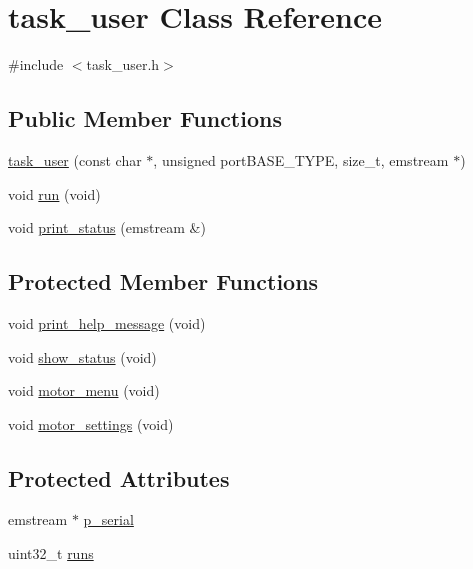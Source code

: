 \hypertarget{classtask__user}{\section{task\-\_\-user \-Class \-Reference}
\label{classtask__user}
}


{\ttfamily \#include $<$task\-\_\-user.\-h$>$}

\subsection*{\-Public \-Member \-Functions}
\begin{DoxyCompactItemize}
\item 
\hyperlink{classtask__user_a3aba77563b375bb14838800608da48bc}{task\-\_\-user} (const char $\ast$, unsigned port\-B\-A\-S\-E\-\_\-\-T\-Y\-P\-E, size\-\_\-t, emstream $\ast$)
\item 
void \hyperlink{classtask__user_adca6429d57be25e8d411414fc8ad75af}{run} (void)
\item 
void \hyperlink{classtask__user_a78170e5ebe8dca1ce0a5a09c507399f1}{print\-\_\-status} (emstream \&)
\end{DoxyCompactItemize}
\subsection*{\-Protected \-Member \-Functions}
\begin{DoxyCompactItemize}
\item 
void \hyperlink{classtask__user_a75475060f83bae1e44bcc8a5c34015c7}{print\-\_\-help\-\_\-message} (void)
\item 
void \hyperlink{classtask__user_a105bebbd9cb1031154c3dfc3662db4a0}{show\-\_\-status} (void)
\item 
void \hyperlink{classtask__user_a62e9a23d2a052ef1c34ef4c6f1152032}{motor\-\_\-menu} (void)
\item 
void \hyperlink{classtask__user_aab1a6f3f0ea7acce28c845a0cf992e6d}{motor\-\_\-settings} (void)
\end{DoxyCompactItemize}
\subsection*{\-Protected \-Attributes}
\begin{DoxyCompactItemize}
\item 
emstream $\ast$ \hyperlink{classtask__user_a04ed5c2b4d7c9a1530bde6f217e01681}{p\-\_\-serial}
\item 
uint32\-\_\-t \hyperlink{classtask__user_ac85973422902084fc9a4692250be32fe}{runs}
\end{DoxyCompactItemize}


